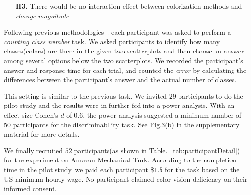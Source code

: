 {\begin{itemize}[noitemsep]
    \item [\textbf{H3.}] There would be no interaction effect between colorization methods and \emph{change magnitude}. .
\end{itemize}

\vspace{.3em}
Following previous methodologies~\cite{Wang2018, Lu21}, each participant was asked to perform a \emph{counting class number} task.  We asked participants to identify how many classes(colors) are there in the given two scatterplots and then choose an answer among several options below the two scatterplots. We recorded the participant's answer and response time for each trial, and counted the \emph{error}  by calculating the differences between the participant's answer and the actual number of classes.


\vspace{.3em}
This setting is similar to the previous task. We invited $29$ participants to do the pilot study and the results were in further fed into a power analysis. With an effect size Cohen's $d$ of $0.6$, the power analysis suggested a minimum number of $50$ participants for the discriminability task.  See Fig.3(b) in the supplementary material for more details.

\vspace{.3em}
We finally recruited $52$ participants(as shown in Table.~\ref{tab:participantDetail}) for the experiment on Amazon Mechanical Turk.
According to the completion time in the pilot study, we paid each participant \$$1.5$ for the task based on the US minimum hourly wage.
No participant claimed color vision deficiency on their informed consent.

}
